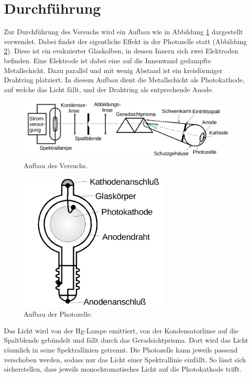 \section{Durchführung}
\label{sec:Durchführung}

Zur Durchführung des Versuchs wird ein Aufbau wie in Abbildung \ref{fig:Aufbau} dargestellt verwendet. Dabei findet der eigentliche Effekt in der Photozelle statt (Abbildung \ref{fig:Photo}). Diese ist ein evakuierter Glaskolben, in dessen Innern sich zwei Elektroden befinden. Eine Elektrode ist dabei eine auf die Innenwand gedampfte Metallschicht. Dazu parallel und mit wenig Abstand ist ein kreisförmiger Drahtring platziert. In diesem Aufbau dient die Metallschicht als Photokathode, auf welche das Licht fällt, und der Drahtring als entprechende Anode. 

\begin{figure}
\centering
\includegraphics[width=\textwidth]{data/Aufbau.png}
\caption{Aufbau des Versuchs.}
\label{fig:Aufbau}
\end{figure}

\begin{figure}
\centering
\includegraphics[height=7cm]{data/Photozelle.png}
\caption{Aufbau der Photozelle.}
\label{fig:Photo}
\end{figure}

Das Licht wird von der Hg-Lampe emittiert, von der Kondensatorlinse auf die Spaltblende gebündelt und fällt durch das Geradsichtprisma. Dort wird das Licht räumlich in seine Spektrallinien getrennt. Die Photozelle kann jeweils passend verschoben werden, sodass nur das Licht einer Spektrallinie einfällt. So lässt sich sicherstellen, dass jeweils monochromatisches Licht auf die Photokathode trifft.



